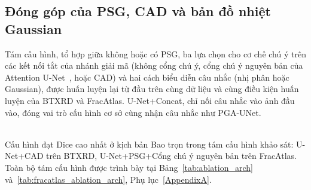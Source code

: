 \subsection{Đóng góp của PSG, CAD và bản đồ nhiệt Gaussian}
\label{subsec:summary_ablation}

Tám cấu hình, tổ hợp giữa không hoặc có PSG, ba lựa chọn cho cơ chế chú ý trên các kết nối tắt của nhánh giải mã (không cổng chú ý, cổng chú ý nguyên bản của Attention U-Net~\cite{oktay2018attentionunet}, hoặc CAD) và hai cách biểu diễn câu nhắc (nhị phân hoặc Gaussian), được huấn luyện lại từ đầu trên cùng dữ liệu và cùng điều kiện huấn luyện của BTXRD và FracAtlas. U-Net+Concat, chỉ nối câu nhắc vào ảnh đầu vào, đóng vai trò cấu hình cơ sở cùng nhận câu nhắc như PGA-UNet.

\begin{table}[H]
    \centering
    \caption{Tổng hợp Dice của ba cấu hình chính trong nghiên cứu loại bỏ thành phần trên BTXRD và FracAtlas (ba kịch bản câu nhắc)}
    \label{tab:ablation_summary}
    \renewcommand{\arraystretch}{1.3}
    \vspace{2pt}
    \\
    \footnotesize Cấu hình đạt Dice cao nhất ở kịch bản Bao trọn trong tám cấu hình khảo sát: U-Net+CAD trên BTXRD, U-Net+PSG+Cổng chú ý nguyên bản trên FracAtlas. Toàn bộ tám cấu hình được trình bày tại Bảng~\ref{tab:ablation_arch} và~\ref{tab:fracatlas_ablation_arch}, Phụ lục~\ref{AppendixA}.
\end{table}

